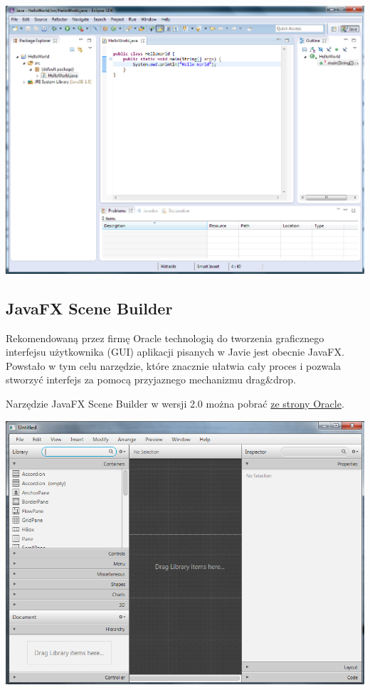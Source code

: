 \documentclass[letterpaper,10pt,english]{sphinxmanual}
\begin{document}
\includegraphics{eclipse.png}


\subsection{JavaFX Scene Builder}
\label{config:javafx-scene-builder}
Rekomendowaną przez firmę Oracle technologią do tworzenia graficznego interfejsu użytkownika (GUI) aplikacji pisanych w Javie jest obecnie JavaFX. Powstało w tym celu narzędzie, które znacznie ułatwia cały proces i pozwala stworzyć interfejs za pomocą przyjaznego mechanizmu drag\&drop.

Narzędzie JavaFX Scene Builder w wersji 2.0 można pobrać \href{http://www.oracle.com/technetwork/java/javase/downloads/sb2download-2177776.html}{ze strony Oracle}.

\includegraphics{scenebuilder.png}
\end{document}
